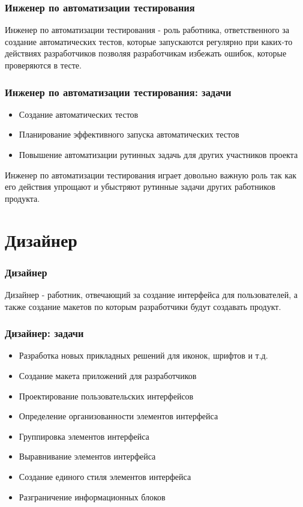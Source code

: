 \documentclass{../industrial-development}
\begin{document}
	\begin{frame} \frametitle{Инженер по автоматизации тестирования}
		\begin{block}{}
			\alert {Инженер по автоматизации тестирования} - роль работника, ответственного за создание автоматических тестов, которые запускаются регулярно при каких-то действиях разработчиков позволяя разработчикам избежать ошибок, которые проверяются в тесте.
		\end{block}
		
	\end{frame}
	
	\begin{frame} \frametitle{Инженер по автоматизации тестирования: задачи}
		\begin{itemize}
			\item Создание автоматических тестов
			\item Планирование эффективного запуска автоматических тестов
			\item Повышение автоматизации рутинных задачь для других участников проекта		
		\end{itemize}
	\end{frame}
	
	\lecturenotes
		Инженер по автоматизации тестирования играет довольно важную роль так как его действия упрощают и убыстряют рутинные задачи других работников продукта.
		
	\section{Дизайнер }
	
	\begin{frame} \frametitle{Дизайнер}
		\begin{block}{}
			\alert {Дизайнер} - работник, отвечающий за создание интерфейса для пользователей, а также создание макетов по которым разработчики будут создавать продукт.
		\end{block}
		
	\end{frame}
	
	\begin{frame} \frametitle{Дизайнер: задачи}
		\begin{itemize}
			\item Разработка новых прикладных решений для иконок, шрифтов и т.д.
			\item Создание макета приложений для разработчиков
			\item Проектирование пользовательских интерфейсов
			\item Определение организованности элементов интерфейса
			\item Группировка элементов интерфейса
			\item Выравнивание элементов интерфейса
			\item Создание единого стиля элементов интерфейса
			\item Разграничение информационных блоков
		\end{itemize}
	\end{frame}
	
\end{document}
